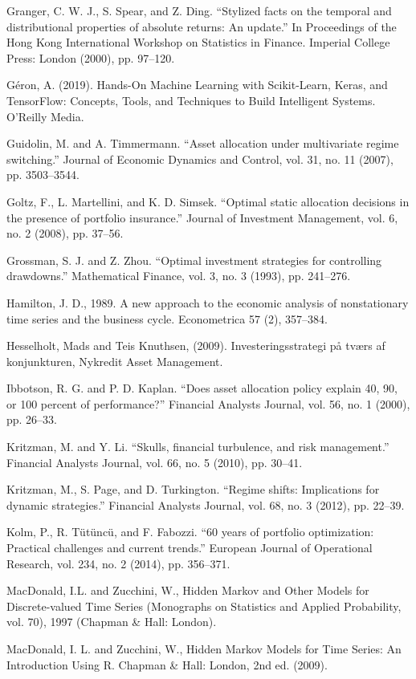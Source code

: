 Granger, C. W. J., S. Spear, and Z. Ding. “Stylized facts on the temporal and
distributional properties of absolute returns: An update.” In Proceedings of
the Hong Kong International Workshop on Statistics in Finance. Imperial
College Press: London (2000), pp. 97–120.

Géron, A. (2019). Hands-On Machine Learning with Scikit-Learn, Keras, and TensorFlow: Concepts, Tools, and Techniques to Build Intelligent Systems. O’Reilly Media.

Guidolin, M. and A. Timmermann. “Asset allocation under multivariate regime switching.” Journal of Economic Dynamics and Control, vol. 31, no. 11 (2007), pp. 3503–3544.

Goltz, F., L. Martellini, and K. D. Simsek. “Optimal static allocation decisions
in the presence of portfolio insurance.” Journal of Investment Management,
vol. 6, no. 2 (2008), pp. 37–56.

Grossman, S. J. and Z. Zhou. “Optimal investment strategies for controlling
drawdowns.” Mathematical Finance, vol. 3, no. 3 (1993), pp. 241–276.

Hamilton, J. D., 1989. A new approach to the economic analysis of nonstationary time series and the business cycle. Econometrica 57 (2), 357–384.


Hesselholt, Mads and Teis Knuthsen, (2009). Investeringsstrategi på tværs af konjunkturen, Nykredit Asset Management.

Ibbotson, R. G. and P. D. Kaplan. “Does asset allocation policy explain 40, 90, or 100 percent of performance?” Financial Analysts Journal, vol. 56, no. 1 (2000), pp. 26–33.

Kritzman, M. and Y. Li. “Skulls, financial turbulence, and risk management.” Financial Analysts Journal, vol. 66, no. 5 (2010), pp. 30–41.

Kritzman, M., S. Page, and D. Turkington. “Regime shifts: Implications for dynamic strategies.” Financial Analysts Journal, vol. 68, no. 3 (2012), pp. 22–39.

Kolm, P., R. Tütüncü, and F. Fabozzi. “60 years of portfolio optimization: Practical challenges and current trends.” European Journal of Operational Research, vol. 234, no. 2 (2014), pp. 356–371.

MacDonald, I.L. and Zucchini, W., Hidden Markov and Other Models for Discrete-valued Time Series (Monographs on Statistics and Applied Probability, vol. 70), 1997 (Chapman \& Hall: London).

MacDonald, I. L. and Zucchini, W., Hidden Markov Models for Time Series: An Introduction Using R. Chapman \& Hall: London, 2nd ed. (2009).

